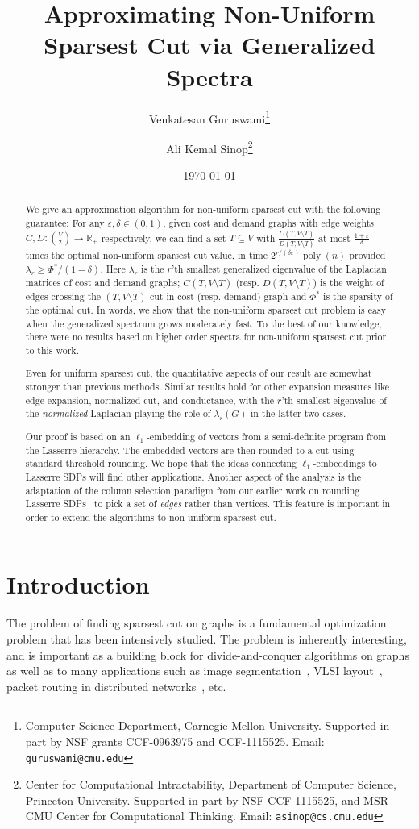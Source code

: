 \documentclass{article}
\title{
  {\bf 
Approximating Non-Uniform Sparsest Cut via Generalized Spectra}}
\author{ Venkatesan Guruswami\footnote{ Computer Science Department,
    Carnegie Mellon University.  Supported in part by NSF grants
    CCF-0963975 and CCF-1115525.  Email: {\tt guruswami@cmu.edu}} \and
  Ali Kemal Sinop\footnote{ Center for Computational Intractability,
    Department of Computer Science, Princeton University.  Supported
    in part by NSF CCF-1115525, and MSR-CMU Center for Computational
    Thinking.  Email: {\tt asinop@cs.cmu.edu}}} \date{\today}
\let\eps=\varepsilon
\DeclareMathOperator{\poly}{poly}
\newcommand{\R}{\mathbb{R}}
\newcounter{alg-count}
\def\ngap{}
\begin{document}
\maketitle
\thispagestyle{empty}

\begin{abstract}
  We give an approximation algorithm for non-uniform sparsest cut with
  the following guarantee: For any $\eps,\delta \in (0,1)$, given cost
  and demand graphs with edge weights $C, D:\binom{V}{2}\to \R_+$
  respectively, we can find a set $T \subseteq V$ with
  $\frac{C(T,V\setminus T)}{D(T,V\setminus T)}$ at most
  $\frac{1+\eps}{\delta}$ times the optimal non-uniform sparsest cut
  value, in time $2^{r/(\delta \eps)} \poly(n)$ provided $\lambda_r
  \ge \Phi^\ast/(1-\delta)$. Here $\lambda_r$ is the $r$'th smallest
  generalized eigenvalue of the Laplacian matrices of cost and demand
  graphs; $C(T,V\setminus T)$ (resp. $D(T,V\setminus T)$) is the
  weight of edges crossing the $(T,V\setminus T)$ cut in cost
  (resp. demand) graph and $\Phi^\ast$ is the sparsity of the optimal
  cut. In words, we show that the non-uniform sparsest cut problem is
  easy when the generalized spectrum grows moderately fast. To the
  best of our knowledge, there were no results based on higher order
  spectra for non-uniform sparsest cut prior to this work.

  Even for uniform sparsest cut, the quantitative aspects of our
  result are somewhat stronger than previous methods.  Similar results
  hold for other expansion measures like edge expansion, normalized
  cut, and conductance, with the $r$'th smallest eigenvalue of the
  {\em normalized} Laplacian playing the role of $\lambda_r(G)$ in the
  latter two cases.

  Our proof is based on an $\ell_1$-embedding of vectors from a
  semi-definite program from the Lasserre hierarchy.  The embedded
  vectors are then rounded to a cut using standard threshold
  rounding. We hope that the ideas connecting $\ell_1$-embeddings to
  Lasserre SDPs will find other applications. Another aspect of the
  analysis is the adaptation of the column selection paradigm from our
  earlier work on rounding Lasserre SDPs~\cite{gs11-qip} to pick a set
  of {\em edges} rather than vertices. This feature is important in
  order to extend the algorithms to non-uniform sparsest cut.
\end{abstract}

\section{Introduction}
\ngap The problem of finding sparsest cut on graphs is a fundamental
optimization problem that has been intensively studied. The problem is
inherently interesting, and is important as a building block for
divide-and-conquer algorithms on graphs as well as to many
applications such as image segmentation~\cite{sm00,sg07a}, VLSI
layout~\cite{bl84}, packet routing in distributed
networks~\cite{ap90a}, etc.
\end{document}
